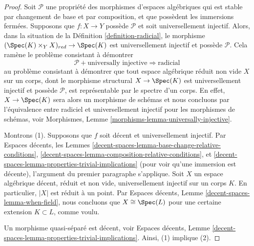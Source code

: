 \begin{proof}
Soit $\mathcal{P}$ une propriété des morphismes d'espaces algébriques
qui est stable par changement de base et par composition, et que possèdent les
immersions fermées. Supposons que $f : X \to Y$ possède $\mathcal{P}$ et
soit universellement injectif. Alors, dans la situation de la
Définition \ref{definition-radicial},
le morphisme $(\Spec(K) \times_Y X)_{red} \to \Spec(K)$
est universellement injectif et possède $\mathcal{P}$. Cela ramène le
problème consistant à démontrer
$$
\mathcal{P} + \text{universally injective}
\Rightarrow
\text{radicial}
$$
au problème consistant à démontrer que tout espace algébrique réduit non vide $X$
sur un corps, dont le morphisme structural $X \to \Spec(K)$ est universellement
injectif et possède $\mathcal{P}$, est représentable par le spectre d'un corps.
En effet, $X \to \Spec(K)$ sera alors un morphisme de schémas et
nous concluons par l'équivalence entre radiciel et universellement injectif pour les
morphismes de schémas, voir
Morphismes, Lemme \ref{morphisms-lemma-universally-injective}.

\medskip\noindent
Montrons (1). Supposons que $f$ soit décent et universellement injectif. Par
Espaces décents,
les Lemmes \ref{decent-spaces-lemma-base-change-relative-conditions},
\ref{decent-spaces-lemma-composition-relative-conditions}, et
\ref{decent-spaces-lemma-properties-trivial-implications}
(pour voir qu'une immersion est décente), l'argument du
premier paragraphe s'applique.
Soit $X$ un espace algébrique décent, réduit et non vide,
universellement injectif sur un corps $K$. En particulier, $|X|$
est réduit à un point. Par
Espaces décents, Lemme \ref{decent-spaces-lemma-when-field},
nous concluons que $X \cong \Spec(L)$ pour une certaine extension
$K \subset L$, comme voulu.

\medskip\noindent
Un morphisme quasi-séparé est décent, voir
Espaces décents,
Lemme \ref{decent-spaces-lemma-properties-trivial-implications}.
Ainsi, (1) implique (2).


\end{proof}
